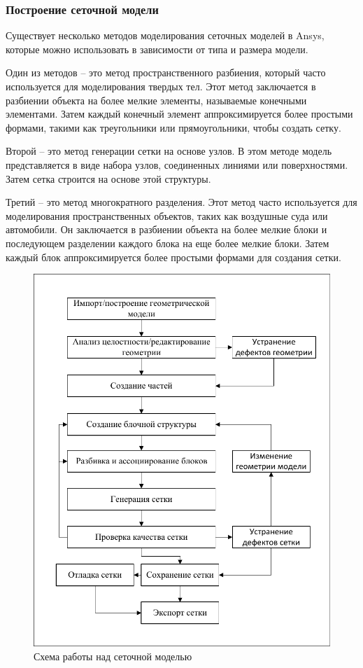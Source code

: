 \documentclass[a4paper]{article}
\begin{document}
	\subsubsection{Построение сеточной модели}
		Существует несколько методов моделирования сеточных моделей в Ansys, которые можно использовать в зависимости от типа и размера модели.
		
		Один из методов -- это метод пространственного разбиения, который часто используется для моделирования твердых тел. Этот метод заключается в разбиении объекта на более мелкие элементы, называемые конечными элементами. Затем каждый конечный элемент аппроксимируется более простыми формами, такими как треугольники или прямоугольники, чтобы создать сетку.
		
		Второй -- это метод генерации сетки на основе узлов. В этом методе модель представляется в виде набора узлов, соединенных линиями или поверхностями. Затем сетка строится на основе этой структуры.
		
		Третий -- это метод многократного разделения. Этот метод часто используется для моделирования пространственных объектов, таких как воздушные суда или автомобили. Он заключается в разбиении объекта на более мелкие блоки и последующем разделении каждого блока на еще более мелкие блоки. Затем каждый блок аппроксимируется более простыми формами для создания сетки.
	
		\begin{figure}[H]
			\centering
			\includegraphics[width=0.8\linewidth]{../Assets/СхемаСозданияСетки}
			\caption{Схема работы над сеточной моделью}
			\label{fig:meshScheme}
		\end{figure}
	
\end{document}
